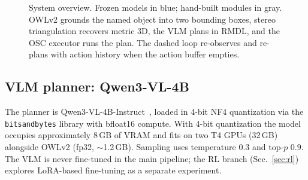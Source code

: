 \documentclass[conference]{IEEEtran}
\begin{document}
\begin{figure}
\centering
{}
\caption{System overview. Frozen models in \textcolor{accent}{blue}; hand-built modules in gray. OWLv2 grounds the named object into two bounding boxes, stereo triangulation recovers metric 3D, the VLM plans in RMDL, and the OSC executor runs the plan. The dashed loop re-observes and re-plans with action history when the action buffer empties.}
\label{fig:architecture}
\end{figure}

\subsection{VLM planner: Qwen3-VL-4B}
\label{sec:vlm}

The planner is Qwen3-VL-4B-Instruct~\cite{qwen3vl}, loaded in 4-bit NF4 quantization via the \texttt{bitsandbytes} library with bfloat16 compute. With 4-bit quantization the model occupies approximately 8\,GB of VRAM and fits on two T4 GPUs (32\,GB) alongside OWLv2 (fp32, $\sim$1.2\,GB). Sampling uses temperature $0.3$ and top-$p$ $0.9$. The VLM is never fine-tuned in the main pipeline; the RL branch (Sec.~\ref{sec:rl}) explores LoRA-based fine-tuning as a separate experiment.
\end{document}
